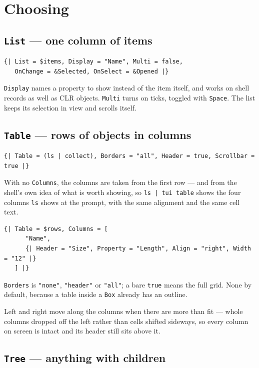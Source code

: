 \documentclass[11pt,a4paper,twoside,openany]{book}
\newcommand{\tosh}[1]{\lstinline[language=tosh]{#1}}
\newcommand{\code}[1]{\texttt{\small #1}}
\begin{document}
\section{Choosing}

\subsection{\texttt{List} --- one column of items}

\begin{lstlisting}
{| List = $items, Display = "Name", Multi = false,
   OnChange = &Selected, OnSelect = &Opened |}
\end{lstlisting}

\code{Display} names a property to show instead of the item itself, and works on
shell records as well as CLR objects. \code{Multi} turns on ticks, toggled with
\code{Space}. The list keeps its selection in view and scrolls itself.

\subsection{\texttt{Table} --- rows of objects in columns}

\begin{lstlisting}
{| Table = (ls | collect), Borders = "all", Header = true, Scrollbar = true |}
\end{lstlisting}

With no \code{Columns}, the columns are taken from the first row --- and from the
shell's own idea of what is worth showing, so \tosh{ls | tui table} shows the four
columns \tosh{ls} shows at the prompt, with the same alignment and the same cell
text.

\begin{lstlisting}
{| Table = $rows, Columns = [
      "Name",
      {| Header = "Size", Property = "Length", Align = "right", Width = "12" |}
   ] |}
\end{lstlisting}

\code{Borders} is \code{"none"}, \code{"header"} or \code{"all"}; a bare
\tosh{true} means the full grid. None by default, because a table inside a
\code{Box} already has an outline.

Left and right move along the columns when there are more than fit --- whole columns
dropped off the left rather than cells shifted sideways, so every column on screen is
intact and its header still sits above it.

\subsection{\texttt{Tree} --- anything with children}
\end{document}
